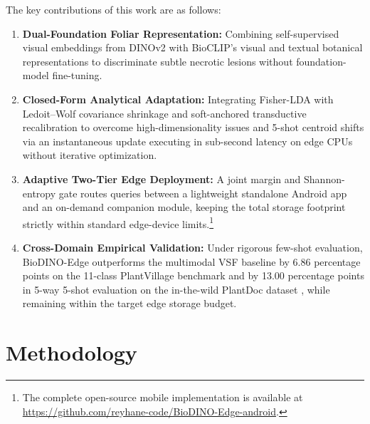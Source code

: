 \documentclass[conference]{IEEEtran}
\begin{document}
The key contributions of this work are as follows:
\begin{enumerate}\setlength{\itemsep}{1pt plus 0.5pt}\setlength{\parsep}{0pt}
    \item \textbf{Dual-Foundation Foliar Representation:} Combining self-supervised visual embeddings from DINOv2 with BioCLIP's visual and textual botanical representations to discriminate subtle necrotic lesions without foundation-model fine-tuning.
    \item \textbf{Closed-Form Analytical Adaptation:} Integrating Fisher-LDA \cite{fisher1936use, rao1948utilization} with Ledoit--Wolf covariance shrinkage \cite{ledoit2004well} and soft-anchored transductive recalibration to overcome high-dimensionality issues and 5-shot centroid shifts via an instantaneous update executing in sub-second latency on edge CPUs without iterative optimization.
    \item \textbf{Adaptive Two-Tier Edge Deployment:} A joint margin and Shannon-entropy \cite{shannon1948mathematical} gate routes queries between a lightweight standalone Android app and an on-demand companion module, keeping the total storage footprint strictly within standard edge-device limits.\footnote{The complete open-source mobile implementation is available at \url{https://github.com/reyhane-code/BioDINO-Edge-android}.}
    \item \textbf{Cross-Domain Empirical Validation:} Under rigorous few-shot evaluation, BioDINO-Edge outperforms the multimodal VSF \cite{zhou2026vsf} baseline by 6.86 percentage points on the 11-class PlantVillage benchmark \cite{hughes2012plantvillage} and by 13.00 percentage points in 5-way 5-shot evaluation on the in-the-wild PlantDoc dataset \cite{singh2020plantdoc}, while remaining within the target edge storage budget.
\end{enumerate}

\section{Methodology}
\label{sec:architecture}
\end{document}
